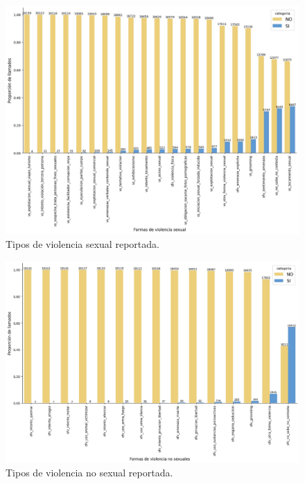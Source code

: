 \documentclass[10 pt]{article}
\begin{document}
\begin{figure}[H]
\begin{center}
\includegraphics[scale=.4]{images/latex_vs_sino.jpeg}
\caption{Tipos de violencia sexual reportada.}
\label{vssino}
\end{center}
\end{figure} 

\begin{figure}[H]
\begin{center}
\includegraphics[scale=.4]{images/latex_ofv_sino.jpeg}
\caption{Tipos de violencia no sexual reportada.}
\label{ofvsino}
\end{center}
\end{figure} 
\end{document}
